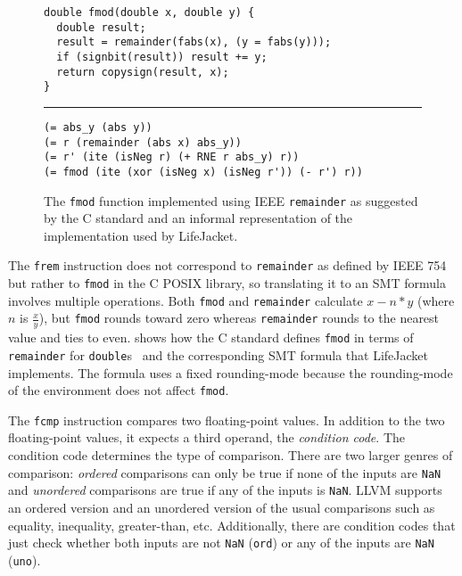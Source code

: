 \documentclass[preprint, numbers]{sigplanconf}
\newcommand{\xxx}{LifeJacket}
\begin{document}
\begin{figure}
\small

\begin{Verbatim}
double fmod(double x, double y) {
  double result;
  result = remainder(fabs(x), (y = fabs(y)));
  if (signbit(result)) result += y;
  return copysign(result, x);
}
\end{Verbatim}
\vspace{-0.2cm}
\noindent\rule{\columnwidth}{0.4pt}
\begin{Verbatim}
(= abs_y (abs y))
(= r (remainder (abs x) abs_y))
(= r' (ite (isNeg r) (+ RNE r abs_y) r))
(= fmod (ite (xor (isNeg x) (isNeg r')) (- r') r))
\end{Verbatim}

\caption{The \texttt{fmod} function implemented using IEEE \texttt{remainder}
as suggested by the C standard and an informal representation of the implementation used by \xxx{}.}

\label{fig:fmod}
\end{figure}

The \texttt{frem} instruction does not correspond to \texttt{remainder} as
defined by IEEE 754 but rather to \texttt{fmod} in the C POSIX library, so
translating it to an SMT formula involves multiple operations.  Both
\texttt{fmod} and \texttt{remainder} calculate $x - n * y$ (where $n$ is
$\frac{x}{y}$), but \texttt{fmod} rounds toward zero whereas \texttt{remainder}
rounds to the nearest value and ties to even.  shows how the C
standard defines \texttt{fmod} in terms of \texttt{remainder} for
\texttt{double}s~\cite[\S F.10.7.1]{c11} and the corresponding SMT formula that
\xxx{} implements. The formula uses a fixed rounding-mode because the
rounding-mode of the environment does not affect \texttt{fmod}.

The \texttt{fcmp} instruction compares two floating-point values. In addition
to the two floating-point values, it expects a third operand, the
\emph{condition code}. The condition code determines the type of comparison.
There are two larger genres of comparison: \emph{ordered} comparisons can only
be true if none of the inputs are \texttt{NaN} and \emph{unordered} comparisons
are true if any of the inputs is \texttt{NaN}. LLVM supports an ordered version
and an unordered version of the usual comparisons such as equality, inequality,
greater-than, etc. Additionally, there are condition codes that just check
whether both inputs are not \texttt{NaN} (\texttt{ord}) or any of the inputs
are \texttt{NaN} (\texttt{uno}).
\end{document}
